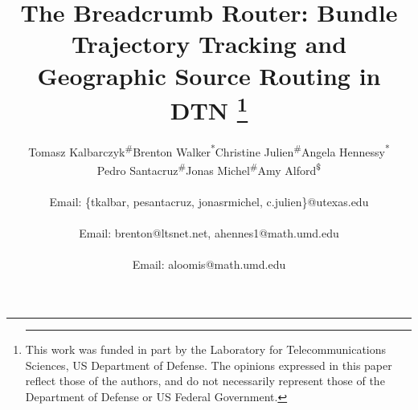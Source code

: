 \title{The Breadcrumb Router: Bundle Trajectory Tracking and Geographic Source Routing in DTN
\thanks{\hrule\vspace{0.1in} This work was funded in part by the Laboratory
for Telecommunications Sciences, US Department of Defense.  The opinions
expressed in this paper reflect those of the authors, and do not
necessarily represent those of the Department of Defense or US Federal
Government.}}

\author{
\alignauthor
Tomasz Kalbarczyk\textsuperscript{\#}\quad Brenton
Walker\textsuperscript{*}\quad Christine
Julien\textsuperscript{\#}\quad Angela
Hennessy\textsuperscript{*}\quad\\
Pedro
Santacruz\textsuperscript{\#}\quad Jonas Michel\textsuperscript{\#}\quad Amy
Alford\textsuperscript{\$}\quad \\  
\\
Email: \{tkalbar, pesantacruz, jonasrmichel, c.julien\}@utexas.edu\\
\\
Email: brenton@ltsnet.net, ahennes1@math.umd.edu\\
\\
Email: aloomis@math.umd.edu
}



\maketitle
